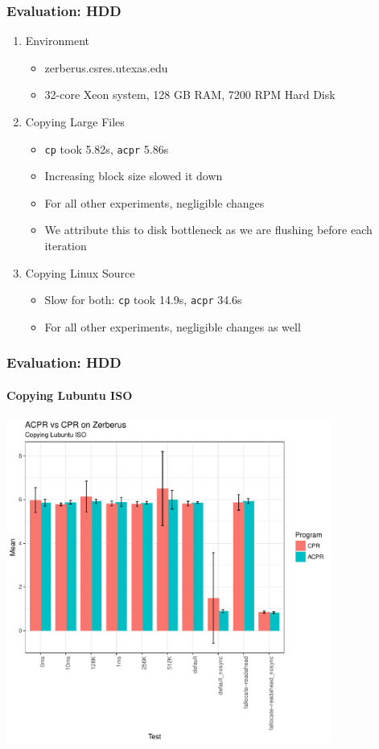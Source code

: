 \documentclass{beamer}
\begin{document}
\begin{frame}
\frametitle{Evaluation: HDD}
\begin{enumerate}[1.]
	\item{Environment}
	\begin{itemize}
		\item zerberus.csres.utexas.edu
		\item 32-core Xeon system, 128 GB RAM, 7200 RPM Hard Disk
	\end{itemize}
	\item{Copying Large Files}
	\begin{itemize}
		\item \texttt{cp} took 5.82s, \texttt{acpr} 5.86s
		\item Increasing block size slowed it down
		\item For all other experiments, negligible changes
		\item We attribute this to disk bottleneck as we are flushing before each iteration
	\end{itemize}
	\item{Copying Linux Source}
	\begin{itemize}
		\item Slow for both: \texttt{cp} took 14.9s, \texttt{acpr} 34.6s
		\item For all other experiments, negligible changes as well
	\end{itemize}
\end{enumerate}
\end{frame}

\begin{frame}
    \frametitle{Evaluation: HDD}
    \framesubtitle{Copying Lubuntu ISO}
    \centering
    \includegraphics[width=0.8\textwidth,height=0.8\textheight,]{CSRES_Lubuntu_Barplot.pdf}
\end{frame}
\end{document}
